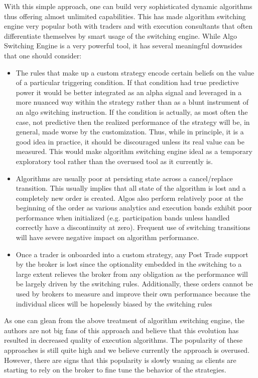 With this simple approach, one can build very sophisticated dynamic algorithms thus offering almost unlimited capabilities. This has made algorithm switching engine very popular both with traders and with execution consultants that often differentiate themselves by smart usage of the switching engine. While Algo Switching Engine is a very powerful tool, it has several meaningful downsides that one should consider:


\begin{itemize}
\item The rules that make up a custom strategy encode certain beliefs on the value of a particular triggering condition. If that condition had true predictive power it would be better integrated as an alpha signal and leveraged in a more nuanced way within the strategy rather than as a blunt instrument of an algo switching instruction. If the condition is actually, as most often the case, not predictive then the realized performance of the strategy will be, in general, made worse by the customization. Thus, while in principle, it is a good idea in practice, it should be discouraged unless its real value can be measured. This would make algorithm switching engine ideal as a temporary exploratory tool rather than the overused tool as it currently is.

\item  Algorithms are usually poor at persisting state across a cancel/replace transition. This usually implies that all state of the algorithm is lost and a completely new order is created. Algos also perform relatively poor at the beginning of the order as various analytics and execution bands exhibit poor performance when initialized (e.g. participation bands unless handled correctly have a discontinuity at zero). Frequent use of switching transitions will have severe negative impact on algorithm performance.

\item Once a trader is onboarded into a custom strategy, any Post Trade support by the broker is lost since the optionality embedded in the switching to a large extent relieves the broker from any obligation as the performance will be largely driven by the switching rules. Additionally, these orders cannot be used by brokers to measure and improve their own performance because the individual slices will be hopelessly biased by the switching rules
\end{itemize}


As one can glean from the above treatment of algorithm switching engine, the authors are not big fans of this approach and believe that this evolution has resulted in decreased quality of execution algorithms. The popularity of these approaches is still quite high and we believe currently the approach is overused. However, there are signs that this popularity is slowly waning as clients are starting to rely on the broker to fine tune the behavior of the strategies. \twomedskip


